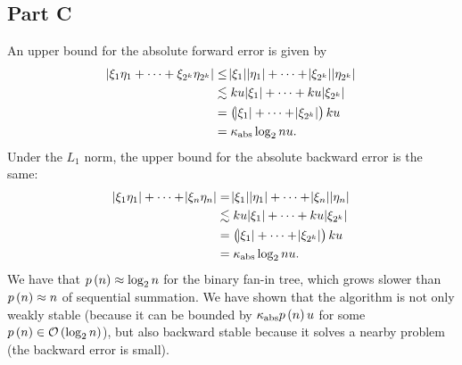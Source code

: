 \documentclass[12pt]{article}
\theoremstyle{definition}
\begin{document}
\subsection*{Part C}
An upper bound for the absolute forward error is given by
\begin{align*}
\abs{\xi_1 \eta_1 + \cdots + \xi_{2^k}\eta_{2^k}} &\leq \abs{\xi_1} \abs{\eta_1} + \cdots + \abs{\xi_{2^k}} \abs{\eta_{2^k}} \\
&\lesssim ku\abs{\xi_1} + \cdots + ku\abs{\xi_{2^k}} \\
&= \del{\abs{\xi_1} + \cdots + \abs{\xi_{2^k}}}ku \\
&= \kappa_{\text{abs}}\log_2{n} u.
\end{align*}
Under the $L_1$ norm, the upper bound for the absolute backward error is the same:
\begin{align*}
\abs{\xi_1\eta_1} + \cdots + \abs{\xi_n \eta_n} &= \abs{\xi_1}\abs{\eta_1} + \cdots + \abs{\xi_n}\abs{\eta_n} \\
&\lesssim ku\abs{\xi_1} + \cdots + ku\abs{\xi_{2^k}} \\
&= \del{\abs{\xi_1} + \cdots + \abs{\xi_{2^k}}}ku \\
&= \kappa_{\text{abs}}\log_2{n} u.
\end{align*}
We have that $p\del{n} \approx \log_2 n$ for the binary fan-in tree, which grows slower than $p\del{n}\approx n$ of sequential summation. We have shown that the algorithm is not only weakly stable (because it can be bounded by $\kappa_{\text{abs}}p\del{n}u$ for some $p\del{n} \in \mathcal{O}\del{\log_2 n}$), but also backward stable because it solves a nearby problem (the backward error is small).
\end{document}
